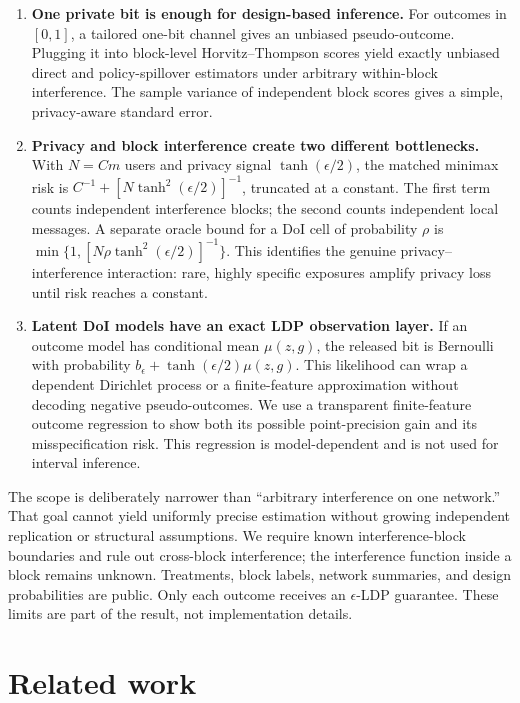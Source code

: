 \documentclass[10pt]{article}
\theoremstyle{definition}
\theoremstyle{remark}
\begin{document}
\begin{enumerate}
  \item \textbf{One private bit is enough for design-based inference.} For outcomes in $[0,1]$,
  a tailored one-bit channel gives an unbiased pseudo-outcome. Plugging it into block-level
  Horvitz--Thompson scores \citep{HorvitzThompson1952} yield exactly unbiased direct and
  policy-spillover estimators under
  arbitrary within-block interference. The sample variance of independent block scores gives
  a simple, privacy-aware standard error.

  \item \textbf{Privacy and block interference create two different bottlenecks.} With
  $N=Cm$ users and privacy signal $\tanh(\epsilon/2)$, the matched minimax risk is
  $C^{-1}+[N\tanh^2(\epsilon/2)]^{-1}$, truncated at a constant. The first term counts
  independent interference blocks; the second counts independent local messages. A separate
  oracle bound for a DoI cell of probability $\rho$ is
  $\min\{1,[N\rho\tanh^2(\epsilon/2)]^{-1}\}$. This identifies the genuine
  privacy--interference interaction: rare, highly specific exposures amplify privacy loss
  until risk reaches a constant.

  \item \textbf{Latent DoI models have an exact LDP observation layer.} If an outcome model has
  conditional mean $\mu(z,g)$, the released bit is Bernoulli with probability
  $b_{\epsilon}+\tanh(\epsilon/2)\mu(z,g)$. This likelihood can wrap a dependent Dirichlet
  process or a finite-feature approximation without decoding negative pseudo-outcomes. We use
  a transparent finite-feature outcome regression to show both its possible point-precision
  gain and its
  misspecification risk. This regression is model-dependent and is not used for interval
  inference.
\end{enumerate}

The scope is deliberately narrower than ``arbitrary interference on one network.'' That goal
cannot yield uniformly precise estimation without growing independent replication or
structural assumptions. We require known interference-block boundaries and rule out cross-block
interference; the interference function
inside a block remains unknown. Treatments, block labels, network summaries, and design
probabilities are public. Only each outcome receives an $\epsilon$-LDP guarantee. These limits
are part of the result, not implementation details.

\section{Related work}
\end{document}

